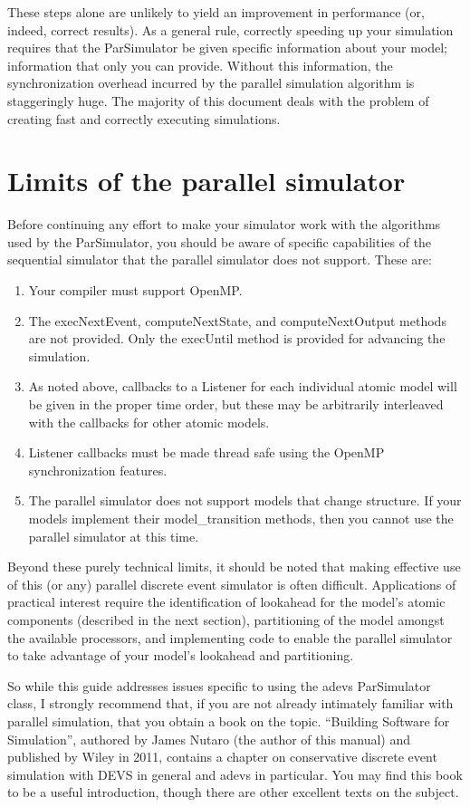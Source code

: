These steps alone are unlikely to yield an improvement in performance (or, indeed, correct results). As a general rule, correctly speeding up your simulation requires that the ParSimulator be given specific information about your model; information that only you can provide. Without this information, the synchronization overhead incurred by the parallel simulation algorithm is staggeringly huge. The majority of this document deals with the problem of creating fast and correctly executing simulations.
 
\section{Limits of the parallel simulator}
Before continuing any effort to make your simulator work with the algorithms used by the ParSimulator, you should be aware of specific capabilities of the sequential simulator that the parallel simulator does not support. These are:
\begin{enumerate}
\item Your compiler must support OpenMP.
\item The execNextEvent, computeNextState, and computeNextOutput methods are not provided. Only the execUntil method is provided for advancing the simulation.
\item As noted above, callbacks to a Listener for each individual atomic model will be given in the proper time order, but these may be arbitrarily interleaved with the callbacks for other atomic models.
\item Listener callbacks must be made thread safe using the OpenMP synchronization features.
\item The parallel simulator does not support models that change structure. If your models implement their model\_transition methods, then you cannot use the parallel simulator at this time.
\end{enumerate}

Beyond these purely technical limits, it should be noted that making effective use of this (or any) parallel discrete event simulator is often difficult. Applications of practical interest require the identification of lookahead for the model's atomic components (described in the next section), partitioning of the model amongst the available processors, and implementing code to enable the parallel simulator to take advantage of your model's lookahead and partitioning.

So while this guide addresses issues specific to using the adevs ParSimulator class, I strongly recommend that, if you are not already intimately familiar with parallel simulation, that you obtain a book on the topic. ``Building Software for Simulation'', authored by James Nutaro (the author of this manual) and published by Wiley in 2011, contains a chapter on conservative discrete event simulation with DEVS in general and adevs in particular. You may find this book to be a useful introduction, though there are other excellent texts on the subject.

